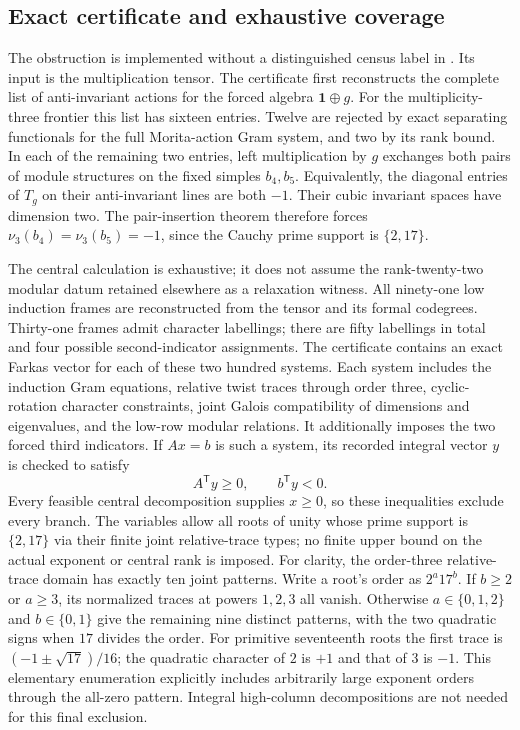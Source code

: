\subsection{Exact certificate and exhaustive coverage}
\label{subsec:stabilizer-rotation-certificate}
The obstruction is implemented without a distinguished census label in
. Its input is the multiplication
tensor.  The certificate first reconstructs the complete list of
anti-invariant actions for the forced algebra $\mathbf1\oplus g$.
For the multiplicity-three frontier this list has sixteen entries.  Twelve
are rejected by exact separating functionals for the full Morita-action Gram
system, and two by its rank bound.  In each of the remaining two entries,
left multiplication by $g$ exchanges both pairs of module structures on the
fixed simples $b_4,b_5$.  Equivalently, the diagonal entries of $T_g$ on their
anti-invariant lines are both $-1$.  Their cubic invariant spaces have
 dimension two.  The pair-insertion theorem therefore forces
$\nu_3(b_4)=\nu_3(b_5)=-1$, since the Cauchy prime support is $\{2,17\}$.

The central calculation is exhaustive; it does not assume the rank-twenty-two
modular datum retained elsewhere as a relaxation witness.  All ninety-one
low induction frames are reconstructed from the tensor and its formal
codegrees.  Thirty-one frames admit character labellings; there are fifty
labellings in total and four possible second-indicator assignments.  The
certificate contains an exact Farkas vector for each of these two hundred
systems.  Each system includes the induction Gram equations, relative twist
traces through order three, cyclic-rotation character constraints, joint
Galois compatibility of dimensions and eigenvalues, and the low-row modular
relations.  It additionally imposes the two forced third indicators.  If
$Ax=b$ is such a system, its recorded integral vector $y$ is checked to satisfy
\[
 A^{\mathsf T}y\geq0,\qquad b^{\mathsf T}y<0.
\]
Every feasible central decomposition supplies $x\geq0$, so these inequalities
exclude every branch.  The variables allow all roots of unity whose prime
support is $\{2,17\}$ via their finite joint relative-trace types; no finite
upper bound on the actual exponent or central rank is imposed.  For clarity, the order-three relative-trace domain has exactly ten joint
patterns.  Write a root's order as $2^a17^b$.  If $b\geq2$ or $a\geq3$,
its normalized traces at powers $1,2,3$ all vanish.  Otherwise
$a\in\{0,1,2\}$ and $b\in\{0,1\}$ give the remaining nine distinct
patterns, with the two quadratic signs when $17$ divides the order.
For primitive seventeenth roots the first trace is
$(-1\pm\sqrt{17})/16$; the quadratic character of $2$ is $+1$ and
that of $3$ is $-1$.  This elementary enumeration explicitly includes
arbitrarily large exponent orders through the all-zero pattern.
Integral high-column decompositions are not needed for this final exclusion.

